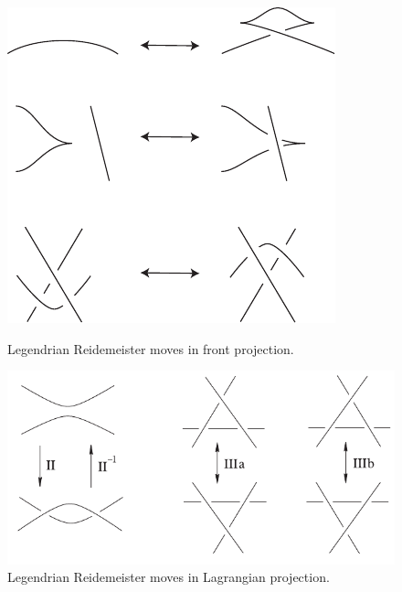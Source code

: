 \begin{figure}
\begin{minipage}[c]{.5\textwidth}
\centering
\includegraphics[width=.8\textwidth]{figs/reid_moves_front.pdf}
\caption{Legendrian Reidemeister moves in front projection.}
\label{fig:reid_move_top}
\end{minipage}
\begin{minipage}[c]{.5\textwidth}
\centering
\includegraphics[width=.8\textwidth]{figs/reid_moves.pdf}
\caption{Legendrian Reidemeister moves in Lagrangian projection.}
\label{fig:reid_move_top}
\end{minipage}
\end{figure}


